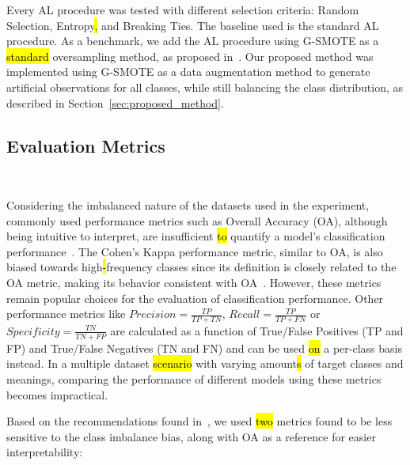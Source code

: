 \documentclass[preprint, 12pt]{elsarticle}
\begin{document}
Every AL procedure was tested with different selection criteria: Random
Selection, Entropy\hl{,} and Breaking Ties. The baseline used is the standard
AL procedure. As a benchmark, we add the AL procedure using G-SMOTE as a
\hl{standard} oversampling method, as proposed in~\cite{Fonseca2021}. Our proposed
method was implemented using G-SMOTE as a data augmentation method to generate
artificial observations for all classes, while still balancing the class
distribution, as described in Section~\ref{sec:proposed_method}. 
 
\subsection{Evaluation Metrics}~\label{sec:evaluation_metrics}

Considering the imbalanced nature of the datasets used in the experiment,
commonly used performance metrics such as Overall Accuracy (OA), although
being intuitive to interpret, are insufficient \hl{to} quantify a model's
classification performance~\cite{Jeni2013}. The Cohen's Kappa performance
metric, similar to OA, is also biased towards high\hl{-}frequency classes
since its definition is closely related to the OA metric, making its behavior
consistent with OA~\cite{Fatourechi2008}. However, these metrics remain
popular choices for the evaluation of classification performance. Other
performance metrics like $Precision = \frac{TP}{TP+TN}$, $Recall =
\frac{TP}{TP+FN}$ or $Specificity = \frac{TN}{TN + FP}$ are calculated as a
function of True/False Positives (TP and FP) and True/False Negatives (TN and
FN) and can be used \hl{on} a per-class basis instead. In a multiple dataset
\hl{scenario} with varying amount\hl{s} of target classes and meanings, comparing
the performance of different models using these metrics becomes impractical.
 
Based on the recommendations found in~\cite{Jeni2013, Kubat1997}, we used
\hl{two} metrics found to be less sensitive to the class imbalance bias, along
with OA as a reference for easier interpretability:
\end{document}

